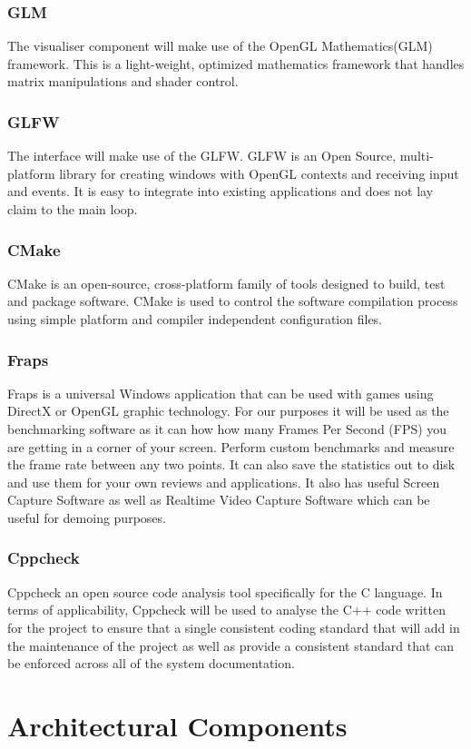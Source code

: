 \documentclass[11pt]{article}
\begin{document}
\subsubsection{GLM}
The visualiser component will make use of the OpenGL Mathematics(GLM) framework. This is a light-weight, optimized mathematics framework that handles matrix manipulations and shader control.
\subsubsection{GLFW}
The interface will make use of the GLFW. GLFW is an Open Source, multi-platform library for creating windows with OpenGL contexts and receiving input and events. It is easy to integrate into existing applications and does not lay claim to the main loop.
\subsubsection{CMake}
CMake is an open-source, cross-platform family of tools designed to build, test and package software. CMake is used to control the software compilation process using simple platform and compiler independent configuration files.
\subsubsection{Fraps}
Fraps is a universal Windows application that can be used with games using DirectX or OpenGL graphic technology. For our purposes it will be used as the benchmarking software as it can how how many Frames Per Second (FPS) you are getting in a corner of your screen.  Perform custom benchmarks and measure the frame rate between any two points. It can also save the statistics out to disk and use them for your own reviews and applications. It also has useful Screen Capture Software as well as Realtime Video Capture Software which can be useful for demoing purposes.
\subsubsection{Cppcheck}
Cppcheck an open source code analysis tool specifically for the C language. In terms of applicability, Cppcheck will be used to analyse the C++ code written for the project to ensure that a single consistent coding standard that will add in the maintenance of the project as well as provide a consistent standard that can be enforced across all of the system documentation.

\section{Architectural Components}
\end{document}
